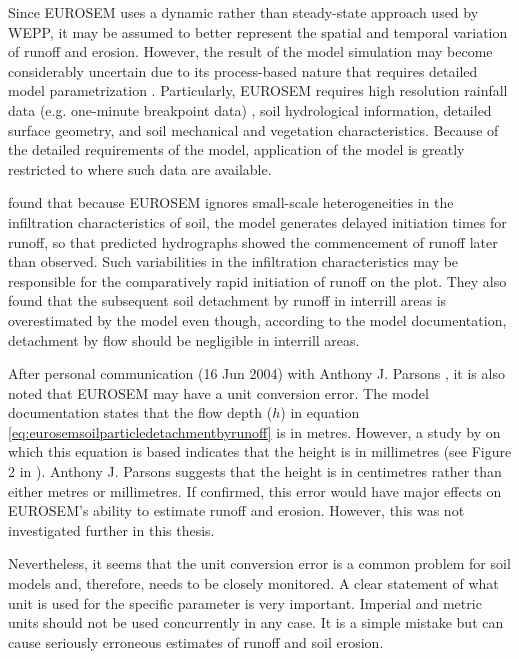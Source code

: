 Since EUROSEM uses a dynamic rather than steady-state approach used by WEPP, it
may be assumed to better represent the spatial and temporal variation of runoff
and erosion. However, the result of the model simulation may become considerably
uncertain due to its process-based nature that requires detailed model
parametrization \citep{quinton1998-65}. Particularly, EUROSEM requires high
resolution rainfall data (e.g. one-minute breakpoint data)
\citep{morgan1998-389}, soil hydrological information, detailed surface
geometry, and soil mechanical and vegetation characteristics. Because of the
detailed requirements of the model, application of the model is greatly
restricted to where such data are available.

\citet{parsons2000-181} found that because EUROSEM ignores small-scale
heterogeneities in the infiltration characteristics of soil, the model generates
delayed initiation times for runoff, so that predicted hydrographs showed the
commencement of runoff later than observed. Such variabilities in the
infiltration characteristics may be responsible for the
comparatively rapid initiation of runoff on the plot. They also found that the
subsequent soil detachment by runoff in interrill areas is overestimated by the
model even though, according to the model documentation, detachment by flow
should be negligible in interrill areas.

After personal communication (16 Jun 2004) with Anthony J. Parsons , it is
also noted that EUROSEM may have a unit conversion error. The model
documentation states that the flow depth ($h$) in equation
\ref{eq:eurosemsoilparticledetachmentbyrunoff} is in metres. However, a study by
\citet{torri1987-149} on which this equation is based indicates that the height
is in millimetres (see Figure 2 in \citet{torri1987-149}). Anthony J. Parsons
suggests that the height is in centimetres rather than either metres or
millimetres. If confirmed, this error would have major effects on EUROSEM's
ability to estimate runoff and erosion. However, this was not investigated
further in this thesis.

Nevertheless, it seems that the unit conversion error is a common problem for
soil models and, therefore, needs to be closely monitored. A clear statement of
what unit is used for the specific parameter is very important. Imperial and
metric units should not be used concurrently in any case. It is a simple mistake
but can cause seriously erroneous estimates of runoff and soil erosion.


